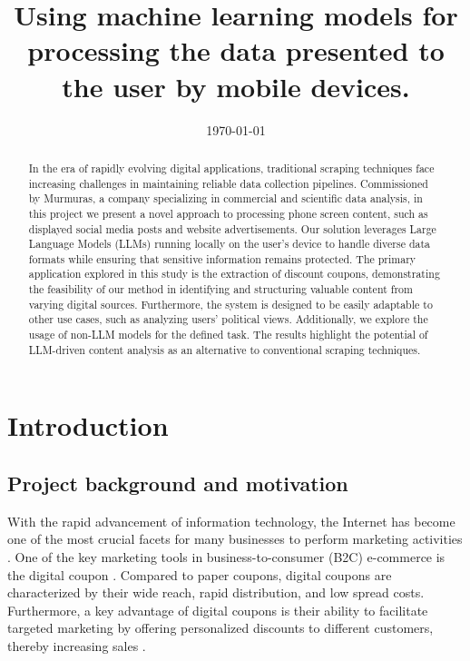 \documentclass[licencjacka,en]{pracamgr}
\title{Using machine learning models for processing the data presented to the user by mobile devices.}
\date{\today}
\begin{document}
\maketitle

\begin{abstract}
In the era of rapidly evolving digital applications, traditional scraping techniques face increasing challenges in maintaining reliable data collection pipelines. Commissioned by Murmuras, a company specializing in commercial and scientific data analysis, in this project we present a novel approach to processing phone screen content, such as displayed social media posts and website advertisements. Our solution leverages Large Language Models (LLMs) running locally on the user's device to handle diverse data formats while ensuring that sensitive information remains protected. The primary application explored in this study is the extraction of discount coupons, demonstrating the feasibility of our method in identifying and structuring valuable content from varying digital sources. Furthermore, the system is designed to be easily adaptable to other use cases, such as analyzing users' political views. Additionally, we explore the usage of non-LLM models for the defined task. The results highlight the potential of LLM-driven content analysis as an alternative to conventional scraping techniques.
\raggedright
\end{abstract}

\tableofcontents
\listoffigures
\listoftables
\listofalgorithms

\chapter{Introduction}

\section{Project background and motivation}
With the rapid advancement of information technology, the Internet has become one of the most crucial facets for many businesses to perform marketing activities \cite{design_of_coupons}. One of the key marketing tools in business-to-consumer (B2C) e-commerce is the digital coupon \cite{targeted_reminders}. Compared to paper coupons, digital coupons are characterized by their wide reach, rapid distribution, and low spread costs. Furthermore, a key advantage of digital coupons is their ability to facilitate targeted marketing by offering personalized discounts to different customers, thereby increasing sales \cite{design_of_coupons}. 
\end{document}
